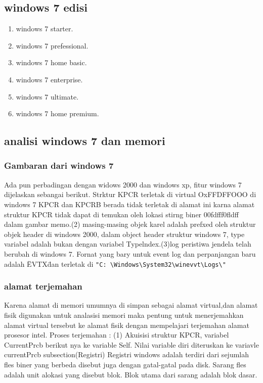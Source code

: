 		\subsection{windows 7 edisi}
		\begin{enumerate}
			\item windows 7 starter.
			\item windows 7 prefessional.
			\item windows 7 home basic.
			\item windows 7 enterprise.
			\item windows 7 ultimate.
			\item windows 7 home premium.
		\end{enumerate}	
		\subsection{analisi windows 7 dan memori}
			\subsubsection{Gambaran dari windows 7}
				Ada pun perbadingan dengan widows 2000 dan windows xp, fitur windows 7 
				dijelaskan sebangai berikut. Strktur KPCR terletak di virtual OxFFDFFOOO
				di windows 7 KPCR dan KPCRB berada tidak terletak di alamat ini karna
				alamat struktur KPCR tidak dapat di temukan oleh lokasi stirng biner 
				00fdfff0fldff dalam gambar memo.(2) masing-masing objek karel adalah 
				prefxed oleh struktur objek header di windows 2000, dalam object header
				struktur windows 7, type variabel adalah bukan dengan variabel 
				Typelndex.(3)log peristiwa jendela telah berubah di windows 7. Fornat 
				yang bary untuk event log dan perpanjangan baru adalah \"EVTX\" 
				dan terletak di \verb|"C: \Windows\System32\winevvt\Logs\"|
		\subsubsection{alamat terjemahan}
			Karena alamat di memori umumnya di simpan sebagai alamat virtual,dan 
			alamat fisik digunakan untuk analasisi memori maka pentung untuk 
			menerjemahkan alamat virtual tersebut ke alamat fisik dengan 
			mempelajari terjemahan alamat prosesor intel. Proses terjemahan :  
			(1) Akuisisi struktur KPCR, variabel CurrentPrcb berikut nya ke 
			variable Self. Nilai variable diri diteruskan ke variavle currentPrcb 
			subsection(Registri)
			Registri windows adalah terdiri dari sejumlah fles biner yang berbeda 
			disebut juga dengan gatal-gatal pada disk. Sarang fles adalah unit 
			alokasi yang disebut blok. Blok utama dari sarang adalah blok dasar.

